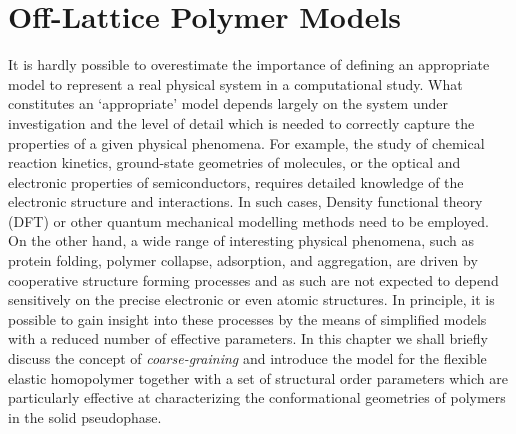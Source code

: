 \documentclass[12pt]{report}
\begin{document}



\chapter{Off-Lattice Polymer Models}
\label{chap:HomopolymerModel}
It is hardly possible to overestimate the importance of defining an appropriate model to represent a real physical system in a computational study. What constitutes an `appropriate' model depends largely on the system under investigation and the level of detail which is needed to correctly capture the properties of a given physical phenomena. For example, the study of chemical reaction kinetics, ground-state geometries of molecules, or the optical and electronic properties of semiconductors, requires detailed knowledge of the electronic structure and interactions. In such cases, Density functional theory (DFT) or other quantum mechanical modelling methods need to be employed. On the other hand, a wide range of interesting physical phenomena, such as protein folding, polymer collapse, adsorption, and aggregation, are driven by cooperative structure forming processes and as such are not expected to depend sensitively on the precise electronic or even atomic structures. In principle, it is possible to gain insight into these processes by the means of simplified models with a reduced number of effective parameters. In this chapter we shall briefly discuss the concept of \textit{coarse-graining} and introduce the model for the flexible elastic homopolymer together with a set of structural order parameters which are particularly effective at characterizing the conformational geometries of polymers in the solid pseudophase.
\end{document}
